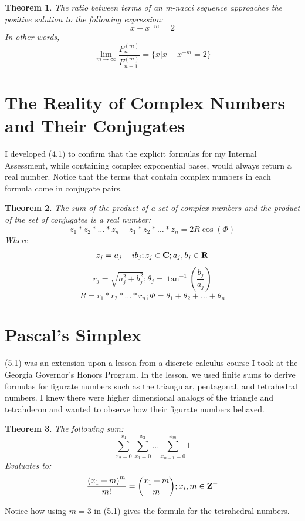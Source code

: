\documentclass[11pt]{article}
\newtheorem{theorem}{Theorem}[section]
\begin{document}
\begin{theorem}
    The ratio between terms of an m-nacci sequence approaches the positive solution to the following expression:
    $$x+x^{-m}=2$$
    In other words, 
    $$\lim_{m \to \infty} \frac{F^{(m)}_n}{F^{(m)}_{n-1}}=\{x|x+x^{-m}=2\}$$
\end{theorem}

\section{The Reality of Complex Numbers and Their Conjugates}

I developed (4.1) to confirm that the explicit formulas for my Internal Assessment, while containing complex exponential bases, would always return a real number. Notice that the terms that contain complex numbers in each formula come in conjugate pairs.

\begin{theorem}
    The sum of the product of a set of complex numbers and the product of the set of conjugates is a real number:
    $$z_1*z_2*\dots*z_n+\bar{z_1}*\bar{z_2}*\dots*\bar{z_n}=2R\cos{(\Phi)}$$
    Where
    $$z_j=a_j+ib_j;z_j\in\mbox{\textbf{C}};a_j,b_j\in\mbox{\textbf{R}}$$
    $$r_j=\sqrt{a_j^2+b_j^2};\theta_j=\tan^{-1}{\left(\frac{b_j}{a_j}\right)}$$
    $$R=r_1*r_2*\dots*r_n;\Phi=\theta_1+\theta_2+\dots+\theta_n$$
\end{theorem}

\section{Pascal's Simplex}

(5.1) was an extension upon a lesson from a discrete calculus course I took at the Georgia Governor's Honors Program. In the lesson, we used finite sums to derive formulas for figurate numbers such as the triangular, pentagonal, and tetrahedral numbers. I knew there were higher dimensional analogs of the triangle and tetrahderon and wanted to observe how their figurate numbers behaved.

\begin{theorem}
    The following sum:
    $$\sum_{x_2 = 0}^{x_1}\sum_{x_3 = 0}^{x_2}\dots\sum_{x_{m+1} = 0}^{x_m}1$$
    Evaluates to:
    $$\frac{{(x_1+m)}^{\underline{m}}}{m!}={{x_1+m} \choose {m}};x_i,m\in\mbox{\textbf{Z}}^+$$
\end{theorem}

Notice how using $m=3$ in (5.1) gives the formula for the tetrahedral numbers.
\end{document}
